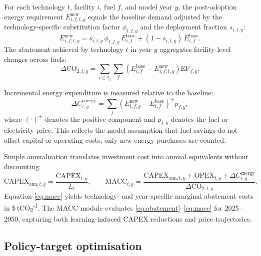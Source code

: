 \documentclass[12pt,a4paper]{article}
\begin{document}
For each technology $t$, facility $i$, fuel $f$, and model year $y$, the post-adoption energy requirement $E^{\mathrm{new}}_{i,f,t,y}$ equals the baseline demand adjusted by the technology-specific substitution factor $\phi_{t,f,y}$ and the deployment fraction $s_{i,t,y}$:
\begin{equation}
E^{\mathrm{new}}_{i,f,t,y} = s_{i,t,y} \, \phi_{t,f,y} \, E^{\mathrm{base}}_{i,f} + (1-s_{i,t,y}) \, E^{\mathrm{base}}_{i,f}.
\end{equation}
The abatement achieved by technology $t$ in year $y$ aggregates facility-level changes across fuels:
\begin{equation}
\Delta \mathrm{CO}_{2,t,y} = \sum_{i \in \mathcal{I}_t} \sum_{f} \left(E^{\mathrm{base}}_{i,f} - E^{\mathrm{new}}_{i,f,t,y}\right) \mathrm{EF}_{f,y}.
\label{eq:abatement}
\end{equation}

Incremental energy expenditure is measured relative to the baseline:
\begin{equation}
\Delta C^{\mathrm{energy}}_{t,y} = \sum_{f} \left(E^{\mathrm{new}}_{t,f,y} - E^{\mathrm{base}}_{t,f}\right)^{+} p_{f,y},
\end{equation}
where $(\cdot)^{+}$ denotes the positive component and $p_{f,y}$ denotes the fuel or electricity price. This reflects the model assumption that fuel savings do not offset capital or operating costs; only new energy purchases are counted.

Simple annualisation translates investment cost into annual equivalents without discounting:
\begin{equation}
\mathrm{CAPEX}_{\mathrm{ann},t,y} = \frac{\mathrm{CAPEX}_{t,y}}{L_t}, \qquad
\mathrm{MACC}_{t,y} = \frac{\mathrm{CAPEX}_{\mathrm{ann},t,y} + \mathrm{OPEX}_{t,y} + \Delta C^{\mathrm{energy}}_{t,y}}{\Delta \mathrm{CO}_{2,t,y}}.
\label{eq:macc}
\end{equation}
Equation \eqref{eq:macc} yields technology- and year-specific marginal abatement costs in \$\,tCO\textsubscript{2}\textsuperscript{-1}. The MACC module evaluates \eqref{eq:abatement}--\eqref{eq:macc} for 2025--2050, capturing both learning-induced CAPEX reductions and price trajectories.

\subsection{Policy-target optimisation}
\end{document}

